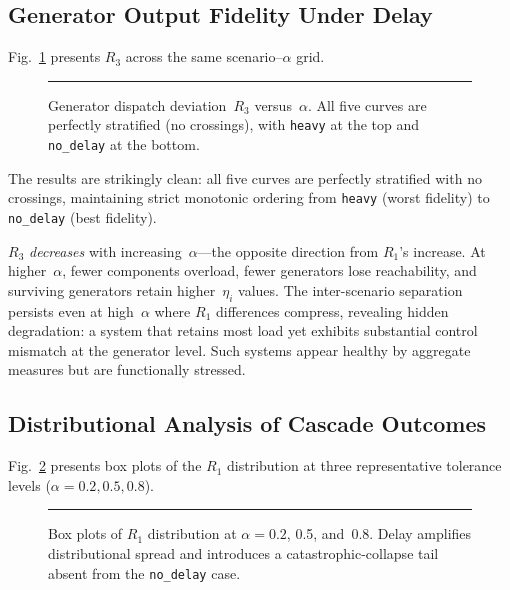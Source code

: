 \documentclass[a4paper,fleqn]{cas-dc}
\newcommand{\Rone}{R_1}
\newcommand{\Rthree}{R_3}
\newcommand{\nodelay}{\texttt{no\_delay}}
\begin{document}
\subsection{Generator Output Fidelity Under Delay}\label{sec:R3result}

Fig.~\ref{fig:R3} presents $\Rthree$ across the same scenario--$\alpha$
grid.

\begin{figure}[t]
\centering
\rule{\columnwidth}{4cm}  %
\caption{Generator dispatch deviation~$\Rthree$ versus~$\alpha$.  All
  five curves are perfectly stratified (no crossings), with \texttt{heavy}
  at the top and \nodelay{} at the bottom.}\label{fig:R3}
\end{figure}

The results are strikingly clean: all five curves are perfectly
stratified with no crossings, maintaining strict monotonic ordering from
\texttt{heavy} (worst fidelity) to \nodelay{} (best fidelity).

$\Rthree$ \emph{decreases} with increasing~$\alpha$---the opposite
direction from $\Rone$'s increase.  At higher~$\alpha$, fewer components
overload, fewer generators lose reachability, and surviving generators
retain higher~$\eta_i$ values.  The inter-scenario separation persists
even at high~$\alpha$ where $\Rone$ differences compress, revealing
hidden degradation: a system that retains most load yet exhibits
substantial control mismatch at the generator level.  Such systems
appear healthy by aggregate measures but are functionally stressed.

\subsection{Distributional Analysis of Cascade Outcomes}\label{sec:boxplot}

Fig.~\ref{fig:boxplot} presents box plots of the $\Rone$ distribution
at three representative tolerance levels ($\alpha=0.2,0.5,0.8$).

\begin{figure}[t]
\centering
\rule{\columnwidth}{4cm}  %
\caption{Box plots of $\Rone$ distribution at $\alpha=0.2$, 0.5,
  and~0.8.  Delay amplifies distributional spread and introduces a
  catastrophic-collapse tail absent from the \nodelay{}
  case.}\label{fig:boxplot}
\end{figure}
\end{document}
